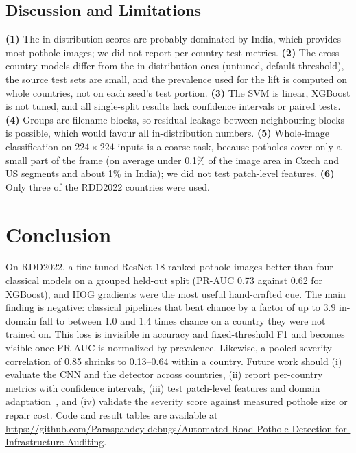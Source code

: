 \documentclass[conference]{IEEEtran}
\begin{document}
\subsection{Discussion and Limitations}\label{sec:disc}
\textbf{(1)} The in-distribution scores are probably dominated by India, which provides most pothole images; we did not report per-country test metrics. \textbf{(2)} The cross-country models differ from the in-distribution ones (untuned, default threshold), the source test sets are small, and the prevalence used for the lift is computed on whole countries, not on each seed's test portion. \textbf{(3)} The SVM is linear, XGBoost is not tuned, and all single-split results lack confidence intervals or paired tests. \textbf{(4)} Groups are filename blocks, so residual leakage between neighbouring blocks is possible, which would favour all in-distribution numbers. \textbf{(5)} Whole-image classification on $224\times224$ inputs is a coarse task, because potholes cover only a small part of the frame (on average under 0.1\% of the image area in Czech and US segments and about 1\% in India); we did not test patch-level features. \textbf{(6)} Only three of the RDD2022 countries were used.

\section{Conclusion}
On RDD2022, a fine-tuned ResNet-18 ranked pothole images better than four classical models on a grouped held-out split (PR-AUC 0.73 against 0.62 for XGBoost), and HOG gradients were the most useful hand-crafted cue. The main finding is negative: classical pipelines that beat chance by a factor of up to 3.9 in-domain fall to between 1.0 and 1.4 times chance on a country they were not trained on. This loss is invisible in accuracy and fixed-threshold F1 and becomes visible once PR-AUC is normalized by prevalence. Likewise, a pooled severity correlation of 0.85 shrinks to 0.13--0.64 within a country. Future work should (i) evaluate the CNN and the detector across countries, (ii) report per-country metrics with confidence intervals, (iii) test patch-level features and domain adaptation~\cite{ganin2016domain}, and (iv) validate the severity score against measured pothole size or repair cost. Code and result tables are available at \url{https://github.com/Paraspandey-debugs/Automated-Road-Pothole-Detection-for-Infrastructure-Auditing}.
\end{document}
